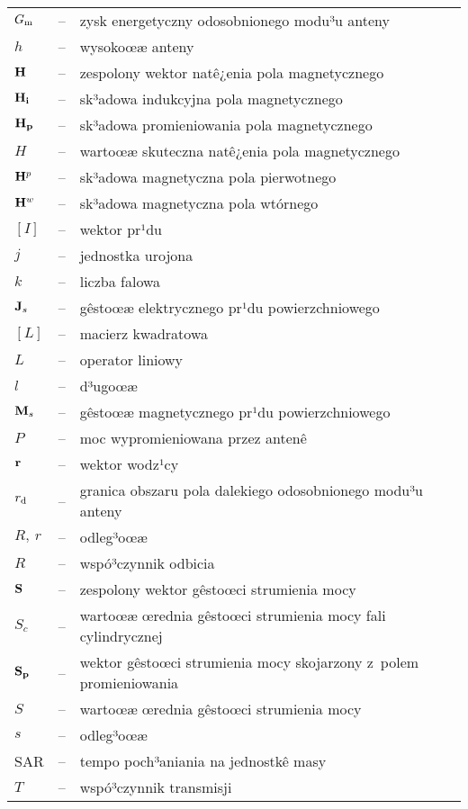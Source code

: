  {\small
\begin{tabular}{lcp{9cm}}
  $G_{\rm m}$ & -- & zysk energetyczny odosobnionego modu³u anteny\\
  $h$ & -- & wysokoœæ anteny\\
  $\bf{H}$ & -- & zespolony wektor natê¿enia pola magnetycznego\\
  $\bf{H}_i$ & -- & sk³adowa indukcyjna pola magnetycznego\\
  $\bf{H}_p$ & -- & sk³adowa promieniowania pola magnetycznego\\
  $H$ & -- & wartoœæ skuteczna natê¿enia pola magnetycznego\\
  ${\bf H}^p$ & -- & sk³adowa magnetyczna pola pierwotnego\\
  ${\bf H}^w$ & -- & sk³adowa magnetyczna pola wtórnego\\
  $[I]$ & -- & wektor pr¹du \\
  $j$ & -- & jednostka urojona \\
  $k$ & -- & liczba falowa \\
  ${\bf J}_s$ & -- & gêstoœæ elektrycznego pr¹du powierzchniowego\\
  $[L]$ & -- & macierz kwadratowa\\
  $L$ & -- & operator liniowy\\
  $l$ & -- & d³ugoœæ\\
  ${\bf M}_s$ & -- & gêstoœæ magnetycznego pr¹du powierzchniowego\\
  $P$ & -- & moc wypromieniowana przez antenê\\
  ${\bf r}$ & -- & wektor wodz¹cy \\
  $r_{\rm d}$ & -- & granica obszaru pola dalekiego odosobnionego
  modu³u anteny\\
  $R,~r$ & -- & odleg³oœæ\\
  $R$ & -- & wspó³czynnik odbicia \\
  $\bf{S}$ & -- & zespolony wektor gêstoœci strumienia mocy\\
  $S_c$ & -- & wartoœæ œrednia gêstoœci strumienia mocy fali cylindrycznej\\
  $\bf{S}_p$ & -- & wektor gêstoœci strumienia mocy skojarzony z~polem promieniowania\\
  $S$ & -- & wartoœæ œrednia gêstoœci strumienia mocy\\
  $s$ & -- & odleg³oœæ \\
  SAR & -- & tempo poch³aniania na jednostkê masy\\
  $T$ & -- & wspó³czynnik transmisji\\

\end{tabular}}
